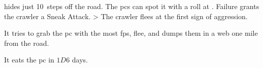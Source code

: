\chitincrawler
\label{crawlerStatblock}

\noindent

 hides just 10~\glspl{step} off the road.
The \glspl{pc} can spot it with a  roll at
\tn.
Failure grants the \gls{crawler} a Sneak Attack.%
\ifnum\value{r12}>\value{hp}
  The \gls{crawler} flees at the first sign of aggression.
\fi

It tries to grab%
the \gls{pc} with the most \glspl{fp}, flee, and dumps them in a web one mile from the road.

It eats the \gls{pc} in $1D6$ days.

